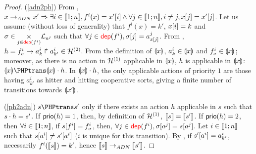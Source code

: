 \begin{proof}
(\ref{adn2ph}) From , $x\rightarrow_{ADN} x'\Rightarrow \exists i\in\mathopen{\llbracket}1\mathclose{};n\mathclose{\rrbracket},
f^i(x)=x'[{i}] \wedge \forall j\in\mathopen{\llbracket}1\mathclose{};n\mathclose{\rrbracket},i\neq j, x[{j}]=x'[{j}]$.
Let us assume (without loss of generality) that $f^i(x)=k'$, $x[{i}]=k$ and
$\sigma\in\underset{j\in\textcolor{red}{\mathsf{dep}}(f^i)}{\times} \mathcal{L}_{a^j}$ such that
$\forall j\in\textcolor{red}{\mathsf{dep}}(f^i), \sigma[{j}]=a^j_{x[{j}]}$.
From , $h=f^i_\sigma\rightarrow a^i_k\Rsh a^i_{k'}\in\mathcal{H}^{(2)}$.
From the definition of $\llparenthesis x\rrparenthesis$,
$a^i_k\in \llparenthesis x\rrparenthesis$ and $f^i_\sigma\in \llparenthesis x\rrparenthesis$;
moreover, as there is no action in $\mathcal{H}^{(1)}$ applicable in $\llparenthesis x\rrparenthesis$,
$h$ is applicable in $\llparenthesis x\rrparenthesis$:
$\encode x\PHPtrans \encode x\play h$.
In $\llparenthesis x\rrparenthesis\cdot h$, the only applicable actions of priority $1$ are those having
$a^i_{k'}$ as hitter and hitting cooperative sorts, giving a finite number of transitions towards
$\llparenthesis x'\rrparenthesis$.

(\ref{ph2adn}) $s\PHPtrans s'$ only if there exists an action $h$ applicable in $s$ such that
$s\cdot h=s'$.
If $\mathsf{prio}(h)=1$, then, by definition of $\mathcal{H}^{(1)}$, 
$\llbracket s\rrbracket=\llbracket s'\rrbracket$.
If $\mathsf{prio}(h)=2$, then $\forall i\in\mathopen{\llbracket}1\mathclose{};n\mathclose{\rrbracket}$,
if $s[{f^i}] = f^i_\sigma$, then, $\forall j\in\textcolor{red}{\mathsf{dep}}(f^i),
\sigma[{a^j}]=s[{a^j}]$.
Let $i\in\mathopen{\llbracket}1\mathclose{};n\mathclose{\rrbracket}$ such that $s[{a^i}]\neq s'[{a^i}]$ ($i$ is unique for this
transition).
By , if $s'[{a^i}]=a^i_{k'}$, necessarily $f^i(\llbracket s\rrbracket)=k'$, hence
$\llbracket s\rrbracket\rightarrow_{ADN} \llbracket s'\rrbracket$.
\end{proof}
